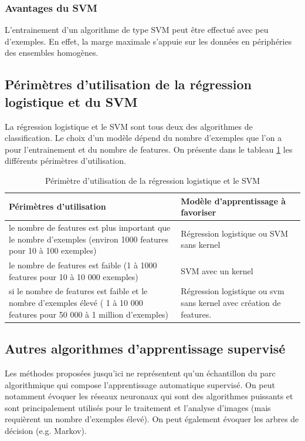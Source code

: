\subsubsection{Avantages du SVM}
\label{Le Machine Learning: Les différents algorithmes: SVM: Avantage du SVM}
L'entrainement d'un algorithme de type SVM peut être effectué avec peu d'exemples. En effet, la marge maximale s'appuie sur les données en périphéries des ensembles homogènes.

\subsection{Périmètres d'utilisation de la régression logistique et du SVM}
\label{Le Machine Learning: Choix de la méthode à utiliser: Comparaison de la régression logistique et le SVM}
La régression logistique et le SVM sont tous deux des algorithmes de classification. Le choix d'un modèle dépend du nombre d'exemples que l'on a pour l'entrainement et du nombre de features. On présente dans le tableau \ref {tab:Périmètre d'utilisation de la régression logistique et le SVM} les différents périmètres d'utilisation.

\begin{table}[h]
	\begin{tabular}{ | p{7cm} | p{7cm} |}
		\hline
		Périmètres d'utilisation & Modèle d'apprentissage à favoriser \\
		\hline 
		le nombre de features est plus important que le nombre d'exemples (environ 1000 features pour 10 à 100 exemples) & Régression logistique ou SVM sans kernel \\
		\hline
		le nombre de features est faible (1 à 1000 features pour 10 à 10 000 exemples) & SVM avec un kernel \\
		\hline 
		si le nombre de features est faible et le nombre d'exemples élevé ( 1 à 10 000 features pour 50 000 à 1 million d'exemples) & Régression logistique ou svm sans kernel avec création de features. \\
		\hline
	\end{tabular}
	\caption[Périmètre d'utilisation de la régression logistique et le SVM]{Périmètre d'utilisation de la régression logistique et le SVM}
	\label {tab:Périmètre d'utilisation de la régression logistique et le SVM}
\end{table}

\subsection{Autres algorithmes d'apprentissage supervisé}
\label{Le Machine Learning: Choix de la méthode à utiliser: Autres algorithmes pour l'apprentissage supervisé}
Les méthodes proposées jusqu'ici ne représentent qu'un échantillon du parc algorithmique qui compose l'apprentissage automatique supervisé. On peut notamment évoquer les réseaux neuronaux qui sont des algorithmes puissants et sont principalement utilisés pour le traitement et l'analyse d'images (mais requièrent un nombre d'exemples élevé). On peut également évoquer les arbres de décision (e.g. Markov).